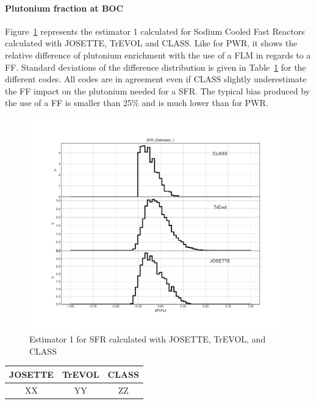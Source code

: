 \paragraph{Plutonium fraction at \gls{BOC}}

Figure~\ref{fig:Est1_SFR} represents the estimator 1 calculated for Sodium
Cooled Fast Reactors calculated with JOSETTE, TrEVOL and CLASS. Like for
\gls{PWR}, it shows the relative difference of plutonium enrichment with the use
of a \gls{FLM} in regards to a \gls{FF}. Standard deviations of the difference
distribution is given in Table~\ref{table:Est1Dev_SFR} for the different codes.
All codes are in agreement even if CLASS slightly underestimate the \gls{FF}
impact on the plutonium needed for a SFR. The typical bias produced by the use
of a \gls{FF} is smaller than 25\% and is much lower than for \gls{PWR}.   

\begin{figure}[h]
	\begin{center}
		\includegraphics[width = 0.99\textwidth]{../../Feature_1/RAW_DATA/FIG/SFR_Estimator_1.pdf}
		\caption{Estimator 1 for SFR calculated with JOSETTE, TrEVOL, and CLASS}
		\label{fig:Est1_SFR}
	\end{center}
\end{figure}

\begin{table}[h]
	\begin{center}
		\begin{tabular}{|c||c||c|}
			\hline 
				JOSETTE & TrEVOL & CLASS \\
			\hline
				XX & YY & ZZ \\
		\end{tabular}
	\end{center}
	\label{table:Est1Dev_SFR}
\end{table}

